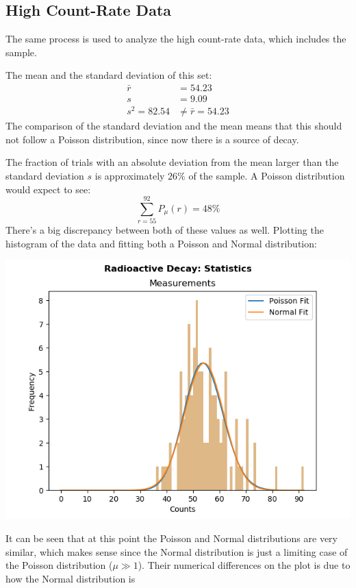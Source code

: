 \documentclass[twocolumn]{article}
\begin{document}
 \subsection{High Count-Rate Data}
 The same process is used to analyze the high count-rate data, which includes the sample.
 
 The mean and the standard deviation of this set:
  \begin{align*}
 \bar{r} &= 54.23 \\
 s &= 9.09 \\
 s^2 = 82.54 &\neq \bar{r} = 54.23
 \end{align*}
 The comparison of the standard deviation and the mean means that this should not follow a Poisson distribution, since now there is a source of decay.
 
 The fraction of trials with an absolute deviation from the mean larger than the standard deviation $s$ is approximately $26\%$ of the sample. A Poisson
 distribution would expect to see:
 \begin{equation*}
  \sum_{r=55}^{92} P_\mu(r) = 48\%
 \end{equation*}
 There's a big discrepancy between both of these values as well.
 \newpage
 Plotting the histogram of the data and fitting both a Poisson and Normal distribution:
 \centerline{\includegraphics[scale = 0.6]{fig3c}}
 It can be seen that at this point the Poisson and Normal distributions are very similar, which makes sense since the Normal distribution is just a
 limiting case of the Poisson distribution ($\mu \gg 1$). Their numerical differences on the plot is due to how the Normal distribution is
\end{document}

